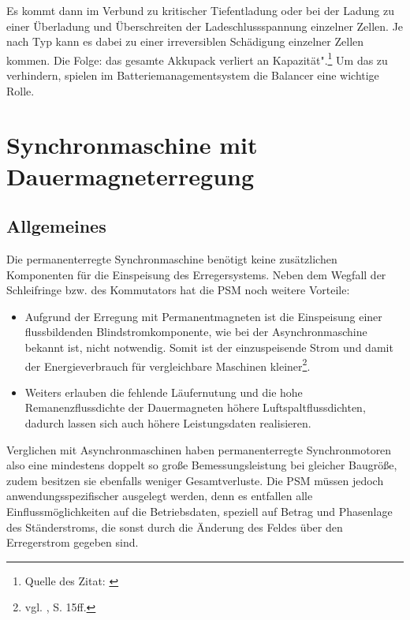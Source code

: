 Es kommt dann im Verbund zu kritischer Tiefentladung oder bei der Ladung zu einer Überladung und Überschreiten der Ladeschlussspannung einzelner Zellen. Je nach Typ kann es dabei zu einer irreversiblen Schädigung einzelner Zellen kommen. Die Folge: das gesamte Akkupack verliert an Kapazität".\footnote{Quelle des Zitat: \cite{BalancingderPacks}}
Um das zu verhindern, spielen im Batteriemanagementsystem die Balancer eine wichtige Rolle.

\newpage


\section{Synchronmaschine mit Dauermagneterregung}
\subsection{Allgemeines}
Die permanenterregte Synchronmaschine benötigt keine zusätzlichen Komponenten für die Einspeisung des Erregersystems. Neben dem Wegfall der Schleifringe bzw. des Kommutators hat die PSM noch weitere Vorteile:
\\[5mm]
\begin{itemize}
	\item Aufgrund der Erregung mit Permanentmagneten ist die Einspeisung einer flussbildenden Blindstromkomponente, wie bei der Asynchronmaschine bekannt ist, nicht notwendig. Somit ist der einzuspeisende Strom und damit der Energieverbrauch für vergleichbare Maschinen kleiner\footnote{vgl. \cite{Dissertation}, S. 15ff.}. \\[3mm]
	\item Weiters erlauben die fehlende Läufernutung und die hohe Remanenzflussdichte der Dauermagneten höhere Luftspaltflussdichten, dadurch lassen sich auch höhere Leistungsdaten realisieren. \\[3mm]
\end{itemize}

Verglichen mit Asynchronmaschinen haben permanenterregte Synchronmotoren also eine mindestens doppelt so große Bemessungsleistung bei gleicher Baugröße, zudem besitzen sie ebenfalls weniger Gesamtverluste. Die PSM müssen jedoch anwendungsspezifischer ausgelegt werden, denn es entfallen alle Einflussmöglichkeiten auf die Betriebsdaten, speziell auf Betrag und Phasenlage des Ständerstroms, die sonst durch die Änderung des Feldes über den Erregerstrom gegeben sind.

